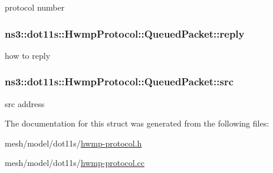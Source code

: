 protocol number 

\subsubsection[{\texorpdfstring{reply}{reply}}]{ ns3\+::dot11s\+::\+Hwmp\+Protocol\+::\+Queued\+Packet\+::reply}\hypertarget{structns3_1_1dot11s_1_1HwmpProtocol_1_1QueuedPacket_a7125c4d25f173fa8954bc88ce0309444}{}\label{structns3_1_1dot11s_1_1HwmpProtocol_1_1QueuedPacket_a7125c4d25f173fa8954bc88ce0309444}


how to reply 

\subsubsection[{\texorpdfstring{src}{src}}]{ ns3\+::dot11s\+::\+Hwmp\+Protocol\+::\+Queued\+Packet\+::src}\hypertarget{structns3_1_1dot11s_1_1HwmpProtocol_1_1QueuedPacket_a82321b28b0bac4ebd029b60927b3d246}{}\label{structns3_1_1dot11s_1_1HwmpProtocol_1_1QueuedPacket_a82321b28b0bac4ebd029b60927b3d246}


src address 



The documentation for this struct was generated from the following files\+:\begin{DoxyCompactItemize}
\item 
mesh/model/dot11s/\hyperlink{hwmp-protocol_8h}{hwmp-\/protocol.\+h}\item 
mesh/model/dot11s/\hyperlink{hwmp-protocol_8cc}{hwmp-\/protocol.\+cc}\end{DoxyCompactItemize}
